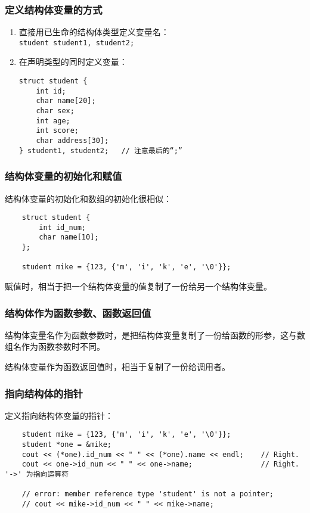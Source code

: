 \documentclass[UTF8]{ctexart}
\begin{document}
\subsubsection{定义结构体变量的方式}
\begin{enumerate}
    \item 直接用已生命的结构体类型定义变量名：\\
    \texttt{student student1, student2;}
    \item 在声明类型的同时定义变量：
\begin{verbatim}
struct student {
    int id;
    char name[20];
    char sex;
    int age;
    int score;
    char address[30];
} student1, student2;   // 注意最后的“;”
\end{verbatim}
\end{enumerate}

\subsubsection{结构体变量的初始化和赋值}
结构体变量的初始化和数组的初始化很相似：
\begin{verbatim}
    struct student {
        int id_num;
        char name[10];
    };

    student mike = {123, {'m', 'i', 'k', 'e', '\0'}};
\end{verbatim}

赋值时，相当于把一个结构体变量的值复制了一份给另一个结构体变量。

\subsubsection{结构体作为函数参数、函数返回值}
结构体变量名作为函数参数时，是把结构体变量复制了一份给函数的形参，这与数组名作为函数参数时不同。

结构体变量作为函数返回值时，相当于复制了一份给调用者。

\subsubsection{指向结构体的指针}
定义指向结构体变量的指针：
\begin{verbatim}
    student mike = {123, {'m', 'i', 'k', 'e', '\0'}};
    student *one = &mike;
    cout << (*one).id_num << " " << (*one).name << endl;    // Right.
    cout << one->id_num << " " << one->name;                // Right. '->' 为指向运算符

    // error: member reference type 'student' is not a pointer;
    // cout << mike->id_num << " " << mike->name;
\end{verbatim}
\end{document}
